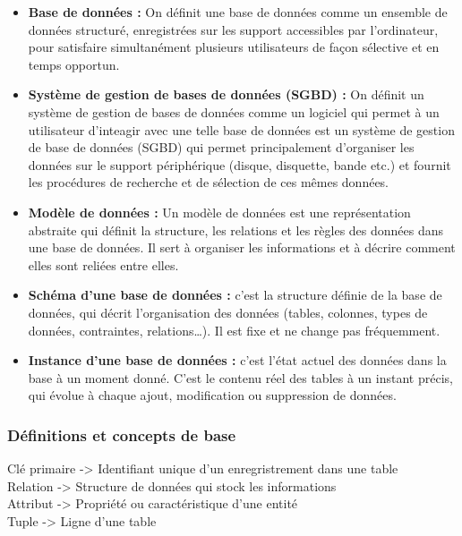 \documentclass{article}
\begin{document}
\begin{itemize}

  \item \textbf{Base de données :} On définit une base de données comme un ensemble de données structuré, enregistrées
sur les support accessibles par l’ordinateur, pour satisfaire simultanément plusieurs utilisateurs de façon sélective et en temps opportun.

\item \textbf{Système de gestion de bases de données (SGBD) :} On définit un système de gestion de bases de données comme un logiciel qui permet à un utilisateur d’inteagir avec une telle base de données est un système de gestion de base de données (SGBD) qui permet principalement d’organiser les données sur le support périphérique (disque, disquette, bande etc.) et fournit les procédures de recherche et de sélection de ces mêmes données. 

\item \textbf{Modèle de données :} Un modèle de données est une représentation abstraite qui définit la structure, les relations et les règles des données dans une base de données. Il sert à organiser les informations et à décrire comment elles sont reliées entre elles.

\item \textbf{Schéma d’une base de données :} c’est la structure définie de la base de données, qui décrit l’organisation des données (tables, colonnes, types de données, contraintes, relations…). Il est fixe et ne change pas fréquemment.

\item \textbf{Instance d’une base de données :} c’est l’état actuel des données dans la base à un moment donné. C’est le contenu réel des tables à un instant précis, qui évolue à chaque ajout, modification ou suppression de données.
\end{itemize}


\subsubsection{Définitions et concepts de base}

Clé primaire -> Identifiant unique d'un enregristrement dans une table \\
Relation     -> Structure de données qui stock les informations \\
Attribut     -> Propriété ou caractéristique d'une entité \\
Tuple        -> Ligne d'une table \\
\end{document}
